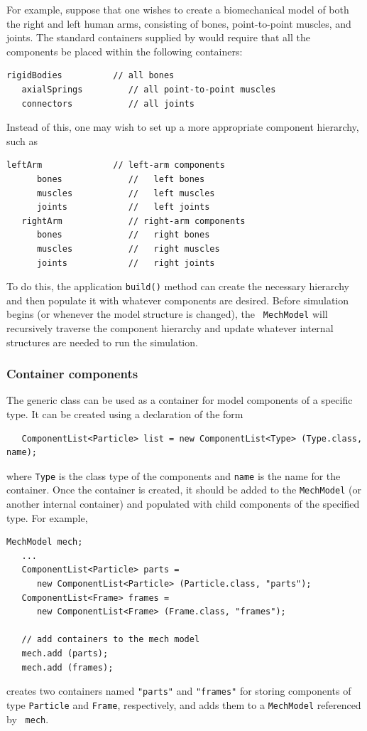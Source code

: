For example, suppose that one wishes to create a biomechanical model
of both the right and left human arms, consisting of bones,
point-to-point muscles, and joints. The standard containers supplied
by  would require that
all the components be placed within the following containers:
%
\begin{lstlisting}[]
   rigidBodies          // all bones
   axialSprings         // all point-to-point muscles
   connectors           // all joints
\end{lstlisting}
%
Instead of this, one may wish to set up a more appropriate component
hierarchy, such as
%
\begin{lstlisting}[]
   leftArm              // left-arm components
      bones             //   left bones
      muscles           //   left muscles
      joints            //   left joints
   rightArm             // right-arm components
      bones             //   right bones
      muscles           //   right muscles
      joints            //   right joints
\end{lstlisting}
%
To do this, the application {\tt build()} method can create the
necessary hierarchy and then
populate it with whatever components are desired.  Before simulation
begins (or whenever the model structure is changed), the {\tt
MechModel} will recursively traverse the component hierarchy and
update whatever internal structures are needed to run the
simulation.

\subsubsection{Container components}

The generic class 
can be used as a container for model components of a specific type.
It can be created using a declaration of the form
%
\begin{lstlisting}
   ComponentList<Particle> list = new ComponentList<Type> (Type.class, name);
\end{lstlisting}
%
where {\tt Type} is the class type of the components and {\tt name} is
the name for the container. Once the container is created, it should
be added to the {\tt MechModel} (or another internal container) and 
populated with child components of the specified type.
For example,
\begin{lstlisting}[]
   MechModel mech; 
   ...
   ComponentList<Particle> parts = 
      new ComponentList<Particle> (Particle.class, "parts");
   ComponentList<Frame> frames = 
      new ComponentList<Frame> (Frame.class, "frames");

   // add containers to the mech model
   mech.add (parts); 
   mech.add (frames);
\end{lstlisting}
creates two containers named {\tt "parts"} and {\tt "frames"} for
storing components of type {\tt Particle} and {\tt Frame},
respectively, and adds them to a {\tt MechModel} referenced by {\tt
mech}.

